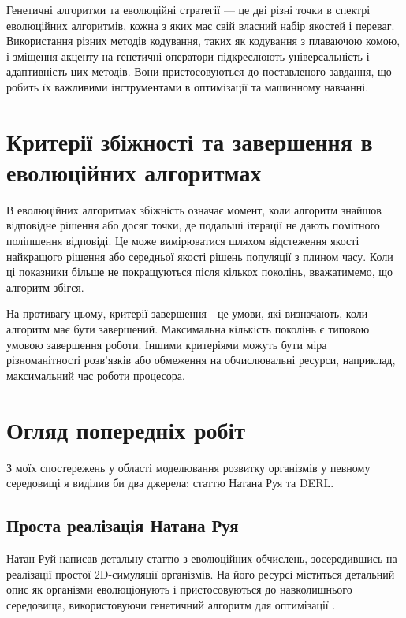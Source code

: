 Генетичні алгоритми та еволюційні стратегії --- це дві різні 
точки в спектрі еволюційних алгоритмів, кожна з яких має 
свій власний набір якостей і переваг. 
Використання різних методів кодування, 
таких як кодування з плаваючою комою, 
і зміщення акценту на генетичні оператори підкреслюють 
універсальність і адаптивність цих методів. 
Вони пристосовуються до поставленого завдання, 
що робить їх важливими інструментами в оптимізації та машинному навчанні.



\section{Критерії збіжності та завершення в еволюційних алгоритмах}

В еволюційних алгоритмах збіжність означає момент, 
коли алгоритм знайшов відповідне рішення або досяг точки, 
де подальші ітерації не дають помітного поліпшення відповіді. 
Це може вимірюватися шляхом відстеження якості найкращого 
рішення або середньої якості рішень популяції з плином часу. 
Коли ці показники більше не покращуються після кількох поколінь, 
вважатимемо, що алгоритм збігся.

На противагу цьому, критерії завершення - це умови,
які визначають, коли алгоритм має бути завершений. 
Максимальна кількість поколінь є типовою умовою завершення роботи.
Іншими критеріями можуть бути міра різноманітності 
розв'язків або обмеження на обчислювальні ресурси, 
наприклад, максимальний час роботи процесора.


\section{Огляд попередніх робіт}

З моїх спостережень у області моделювання розвитку організмів у певному
середовищі я виділив би два джерела: 
статтю Натана Руя \cite{rooyEvolvingSimpleOrganisms} та DERL.

\subsection{Проста реалізація Натана Руя}

Натан Руй написав детальну статтю з еволюційних обчислень, зосередившись на
реалізації простої 2D-симуляції організмів.
На його ресурсі міститься детальний опис як організми еволюціонують і
пристосовуються до навколишнього середовища, використовуючи генетичний
алгоритм для оптимізації \cite{rooyEvolvingSimpleOrganisms}.

